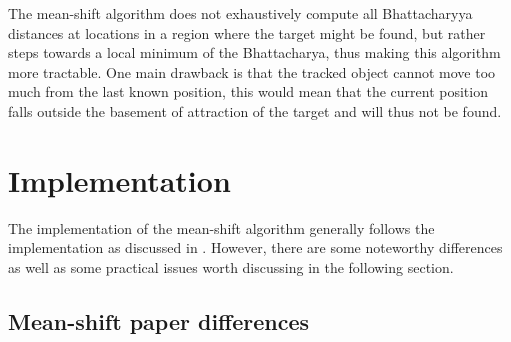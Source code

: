 \documentclass[a4paper,11pt]{article}
\begin{document}
The mean-shift algorithm does not exhaustively compute all Bhattacharyya distances at locations in a region where the target might be found, but rather steps towards a local minimum of the Bhattacharya, thus making this algorithm more tractable. One main drawback is that the tracked object cannot move too much from the last known position, this would mean that the current position falls outside the basement of attraction of the target and will thus not be found. 










	
















\section{Implementation}

The implementation of the mean-shift algorithm generally follows the implementation as discussed in \cite{mean_shift}. However, there are some noteworthy differences as well as some practical issues worth discussing in the following section.



\subsection{Mean-shift paper differences}
\end{document}
